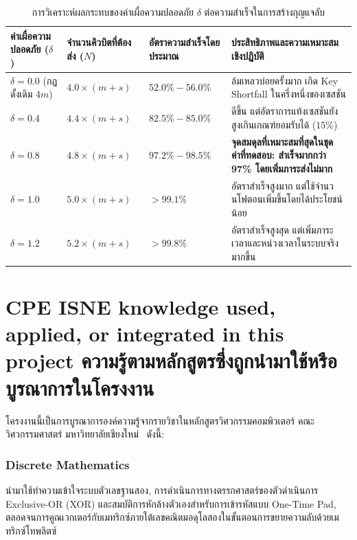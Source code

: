 \begin{table}[htbp]
\centering
\renewcommand{\arraystretch}{1.35}
\setlength{\extrarowheight}{2.5pt}
\begin{tabularx}{\textwidth}{>{\centering\arraybackslash}p{3.2cm} >{\centering\arraybackslash}p{3.2cm} >{\centering\arraybackslash}p{3cm} >{\raggedright\arraybackslash}X}
\hline
\textbf{ค่าเผื่อความปลอดภัย ($\delta$)} & \textbf{จำนวนคิวบิตที่ต้องส่ง ($N$)} & \textbf{อัตราความสำเร็จโดยประมาณ} & \textbf{ประสิทธิภาพและความเหมาะสมเชิงปฏิบัติ} \\ \hline
\rowcolor{white}
$\delta = 0.0$ (กฎดั้งเดิม $4m$) & $4.0 \times (m+s)$ & $52.0\% - 56.0\%$ & ล้มเหลวบ่อยครั้งมาก เกิด Key Shortfall ในครึ่งหนึ่งของเซสชัน \\
\rowcolor[HTML]{E4E7EB}
$\delta = 0.4$ & $4.4 \times (m+s)$ & $82.5\% - 85.0\%$ & ดีขึ้น แต่อัตราการแท้งเซสชันยังสูงเกินเกณฑ์ยอมรับได้ ($15\%$) \\
\rowcolor{white}
$\delta = 0.8$ & $4.8 \times (m+s)$ & $97.2\% - 98.5\%$ & \textbf{จุดสมดุลที่เหมาะสมที่สุดในชุดค่าที่ทดสอบ: สำเร็จมากกว่า 97\% โดยเพิ่มภาระส่งไม่มาก} \\
\rowcolor[HTML]{E4E7EB}
$\delta = 1.0$ & $5.0 \times (m+s)$ & $> 99.1\%$ & อัตราสำเร็จสูงมาก แต่ใช้จำนวนโฟตอนเพิ่มขึ้นโดยได้ประโยชน์น้อย \\
\rowcolor{white}
$\delta = 1.2$ & $5.2 \times (m+s)$ & $> 99.8\%$ & อัตราสำเร็จสูงสุด แต่เพิ่มภาระเวลาและหน่วงเวลาในระบบจริงมากขึ้น \\ \hline
\end{tabularx}
\caption{การวิเคราะห์ผลกระทบของค่าเผื่อความปลอดภัย $\delta$ ต่อความสำเร็จในการสร้างกุญแจลับ}
\label{tab:delta_safety_margin}
\end{table}

\section{\ifenglish%
\ifcpe CPE \else ISNE \fi knowledge used, applied, or integrated in this project
\else%
ความรู้ตามหลักสูตรซึ่งถูกนำมาใช้หรือบูรณาการในโครงงาน
\fi
}

โครงงานนี้เป็นการบูรณาการองค์ความรู้จากรายวิชาในหลักสูตรวิศวกรรมคอมพิวเตอร์ คณะวิศวกรรมศาสตร์ มหาวิทยาลัยเชียงใหม่~\cite{cmu_cpe_curriculum} ดังนี้:

\subsubsection{Discrete Mathematics}
นำมาใช้ทำความเข้าใจระบบตัวเลขฐานสอง, การดำเนินการทางตรรกศาสตร์ของตัวดำเนินการ Exclusive-OR (XOR) และสมบัติการหักล้างตัวเองสำหรับการเข้ารหัสแบบ One-Time Pad, ตลอดจนการคูณเวกเตอร์กับเมทริกซ์ภายใต้เลขคณิตมอดุโลสองในขั้นตอนการขยายความลับด้วยเมทริกซ์โทพลิตซ์

